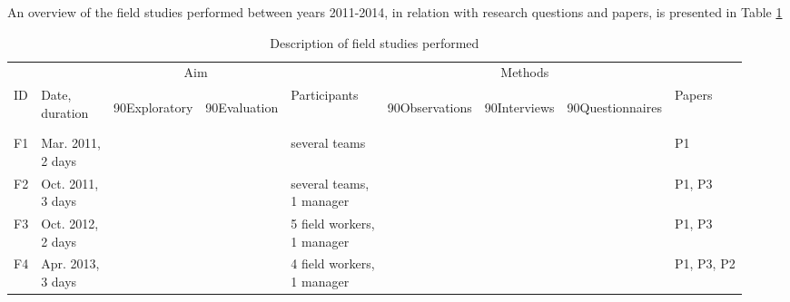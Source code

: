 An overview of the field studies performed between years 2011-2014, in relation with research questions and papers, is presented  in Table \ref{field-studies}
\begin{table}
	[h] \centering \caption{Description of field studies performed} \label{field-studies} 
	\begin{tabular}
		{@{}lllllllll@{}} 
		
		\toprule & & \multicolumn{2}{c}{Aim} & & \multicolumn{3}{c}{Methods} & \\
		\cline{3-4} \cline{6-8} \noalign{\smallskip} ID & \specialcell[b]{Date,\\duration} & 
		\begin{turn}
			{90}Exploratory
		\end{turn}
		& 
		\begin{turn}
			{90}Evaluation
		\end{turn}
		& Participants & 
		\begin{turn}
			{90}Observations
		\end{turn}
		& 
		\begin{turn}
			{90}Interviews
		\end{turn}
		& 
		\begin{turn}
			{90}Questionnaires
		\end{turn}
		& Papers \\
		\midrule \noalign{\smallskip} F1 & \specialcell[t]{Mar. 2011,\\2 days} & \textbullet & & several teams & \textbullet & \textbullet & & P1 \\
		F2 & \specialcell[t]{Oct. 2011,\\3 days} & \textbullet & & \specialcell[t]{several teams,\\1 manager} & \textbullet & \textbullet & & P1, P3 \\
		F3 & \specialcell[t]{Oct. 2012,\\2 days} & \textbullet & \textbullet & \specialcell[t]{5 field workers,\\1 manager} & \textbullet & \textbullet & & P1, P3 \\
		F4 & \specialcell[t]{Apr. 2013,\\3 days} & \textbullet & \textbullet & \specialcell[t]{4 field workers,\\1 manager} & \textbullet & \textbullet & \textbullet & P1, P3, P2 \\

\end{tabular}
\end{table}
